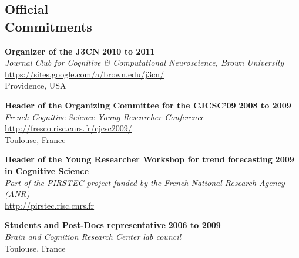 \documentclass[margin,line]{resume}
\begin{document}
\begin{resume}
\newpage


%

\vspace{3mm}
    \section{\mysidestyle Official\\ Commitments} %

	\textbf{Organizer of the J3CN} \hfill \textbf{2010 to 2011}\\
	\textsl{Journal Club for Cognitive \& Computational Neuroscience, Brown University}\\
	 \url{https://sites.google.com/a/brown.edu/j3cn/}\\
	Providence, USA	

	\textbf{Header of the Organizing Committee for the CJCSC'09} \hfill \textbf{2008 to 2009}\\
	\textsl{French Cognitive Science Young Researcher Conference}\\
	 \url{http://fresco.risc.cnrs.fr/cjcsc2009/}\\
	Toulouse, France		

	\textbf{Header of the Young Researcher Workshop for trend forecasting} \hfill \textbf{2009}\\
	 \textbf{in Cognitive Science}\\
	\textsl{Part of the PIRSTEC project funded by the French National Research Agency (ANR)}\\
	 \url{http://pirstec.risc.cnrs.fr}

	\textbf{Students and Post-Docs representative} \hfill \textbf{2006 to 2009}\\
	\textsl{Brain and Cognition Research Center lab council}\\
	Toulouse, France	


\end{resume}
\end{document}
